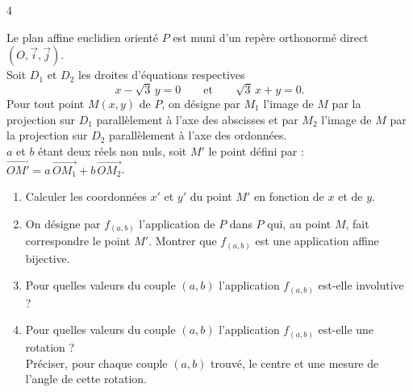 \documentclass{axiobac}
\begin{document}
\entete

\begin{exercice}{4}
\horsprogramme

Le plan affine euclidien orienté $P$ est muni d'un repère orthonormé direct $(O, \vec{i}, \vec{j})$. \\
Soit $D_1$ et $D_2$ les droites d'équations respectives
\[
x - \sqrt{3}\,y = 0 \qquad \text{et} \qquad \sqrt{3}\,x + y = 0 .
\]
Pour tout point $M(x, y)$ de $P$, on désigne par $M_1$ l'image de $M$ par la projection sur $D_1$ parallèlement à l'axe des abscisses et par $M_2$ l'image de $M$ par la projection sur $D_2$ parallèlement à l'axe des ordonnées. \\
$a$ et $b$ étant deux réels non nuls, soit $M'$ le point défini par : $\overrightarrow{OM'} = a\,\overrightarrow{OM_1} + b\,\overrightarrow{OM_2}$.

\begin{enumerate}
    \item Calculer les coordonnées $x'$ et $y'$ du point $M'$ en fonction de $x$ et de $y$.
    \item On désigne par $f_{(a,b)}$ l'application de $P$ dans $P$ qui, au point $M$, fait correspondre le point $M'$. Montrer que $f_{(a,b)}$ est une application affine bijective.
    \item Pour quelles valeurs du couple $(a, b)$ l'application $f_{(a,b)}$ est-elle involutive ?
    \item Pour quelles valeurs du couple $(a, b)$ l'application $f_{(a,b)}$ est-elle une rotation ? \\
    Préciser, pour chaque couple $(a, b)$ trouvé, le centre et une mesure de l'angle de cette rotation.
\end{enumerate}

\end{exercice}
\end{document}

